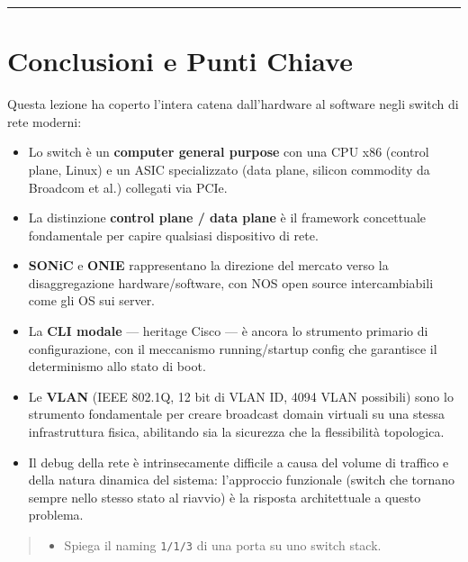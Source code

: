 \documentclass[
  italian,
  openany]{book}
\providecommand{\tightlist}{%
  \setlength{\itemsep}{0pt}\setlength{\parskip}{0pt}}
\begin{document}
\begin{center}\rule{0.5\linewidth}{0.5pt}\end{center}

\section{Conclusioni e Punti Chiave}\label{conclusioni-e-punti-chiave-1}

Questa lezione ha coperto l'intera catena dall'hardware al software
negli switch di rete moderni:

\begin{itemize}
\tightlist
\item
  Lo switch è un \textbf{computer general purpose} con una CPU x86
  (control plane, Linux) e un ASIC specializzato (data plane, silicon
  commodity da Broadcom et al.) collegati via PCIe.
\item
  La distinzione \textbf{control plane / data plane} è il framework
  concettuale fondamentale per capire qualsiasi dispositivo di rete.
\item
  \textbf{SONiC} e \textbf{ONIE} rappresentano la direzione del mercato
  verso la disaggregazione hardware/software, con NOS open source
  intercambiabili come gli OS sui server.
\item
  La \textbf{CLI modale} --- heritage Cisco --- è ancora lo strumento
  primario di configurazione, con il meccanismo running/startup config
  che garantisce il determinismo allo stato di boot.
\item
  Le \textbf{VLAN} (IEEE 802.1Q, 12 bit di VLAN ID, 4094 VLAN possibili)
  sono lo strumento fondamentale per creare broadcast domain virtuali su
  una stessa infrastruttura fisica, abilitando sia la sicurezza che la
  flessibilità topologica.
\item
  Il debug della rete è intrinsecamente difficile a causa del volume di
  traffico e della natura dinamica del sistema: l'approccio funzionale
  (switch che tornano sempre nello stesso stato al riavvio) è la
  risposta architettuale a questo problema.
\end{itemize}

\begin{quote}
\begin{itemize}
\tightlist
\item
  Spiega il naming \texttt{1/1/3} di una porta su uno switch stack.
\end{itemize}
\end{quote}
\end{document}
